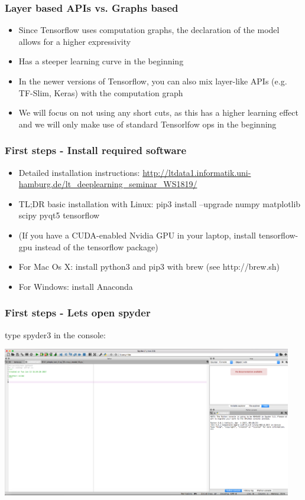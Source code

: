 \documentclass{beamer}
\begin{document}
\begin{frame}[fragile]
  \frametitle{Layer based APIs vs. Graphs based}
  \begin{itemize}
		\item  Since Tensorflow uses computation graphs, the declaration of the model allows for a higher expressivity
		\item  Has a steeper learning curve in the beginning
		\item  In the newer versions of Tensorflow, you can also mix layer-like APIs (e.g. TF-Slim, Keras) with the computation graph
		\item  We will focus on not using any short cuts, as this has a higher learning effect and we will only make use of standard Tensorlfow ops in the beginning
  \end{itemize}
\end{frame} 

\begin{frame}
\frametitle{First steps - Install required software }

\begin{itemize}
	\item Detailed installation instructions: \url{http://ltdata1.informatik.uni-hamburg.de/lt_deeplearning_seminar_WS1819/}
	\item TL;DR basic installation with Linux: pip3 install --upgrade numpy matplotlib scipy pyqt5 tensorflow
	\item (If you have a CUDA-enabled Nvidia GPU in your laptop, install tensorflow-gpu instead of the tensorflow package)
	\item For Mac Os X: install python3 and pip3 with brew (see http://brew.sh)
	\item For Windows: install Anaconda
\end{itemize}

\end{frame} 

\begin{frame}[fragile]
\frametitle{First steps - Lets open spyder}

type spyder3 in the console:

\includegraphics[width=0.95\textwidth]{spyder}

\end{frame} 
\end{document}
